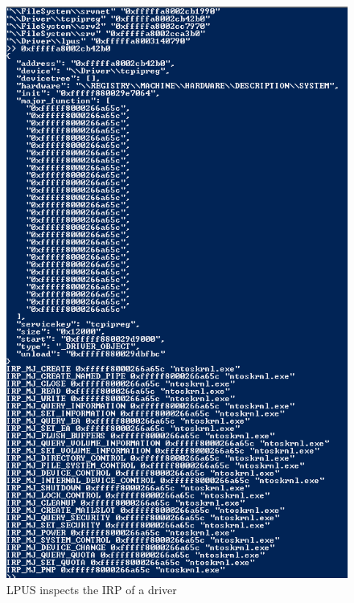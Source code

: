 \begin{figure}[h]
  \centering
  \caption{LPUS inspects the IRP of a driver}
  \label{fig:irp_lpus}
  \includegraphics[scale=1]{images/irp_lpus.png}
\end{figure}


